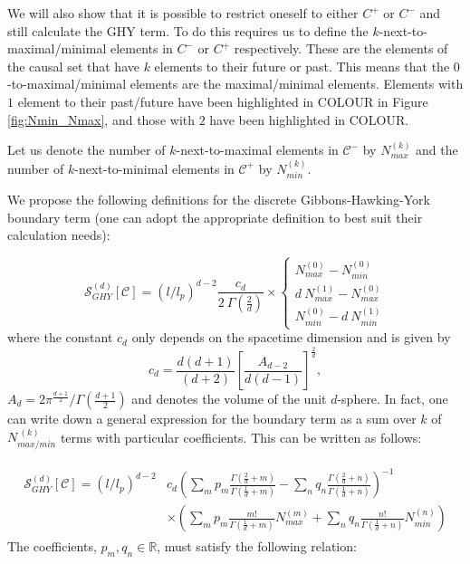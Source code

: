 \documentclass[12pt]{article}
\newcommand{\be}{\begin{equation}}
\newcommand{\ee}{\end{equation}}
\newcommand{\mb}[1]{\marginnote{\texttt{\small MB:\,#1}}}
\begin{document}
We will also show that it is possible to restrict oneself to either $C^+$ or $C^-$ and still calculate the GHY term. To do this requires us to define the $k$-next-to-maximal/minimal elements in $C^-$ or $C^+$ respectively. These are the elements of the causal set that have $k$ elements to their future or past. This means that the $0$-to-maximal/minimal elements are the maximal/minimal elements. Elements with $1$ element to their past/future have been highlighted in COLOUR in Figure \ref{fig:Nmin_Nmax}, and those with $2$ have been highlighted in COLOUR.

Let us denote the number of $k$-next-to-maximal elements in $\mathcal C^-$ by $N_{max}^{(k)}$ and the number of $k$-next-to-minimal elements in $\mathcal C^+$  by $N_{min}^{(k)}$.

We propose the following definitions for the discrete Gibbons-Hawking-York boundary term (one can adopt the appropriate definition to best suit their calculation needs):\mb{$S[\mathcal C, \Sigma]$?}

\be\label{GH_boundary_to_causet}
 \mathcal{S}^{(d)}_{GHY}[\mathcal C]=\left(l/l_p\right)^{d-2}\frac{c_{d}}{2\: \Gamma\left(\frac{2}{d} \right)}\times
  \begin{cases}
   N_{max}^{(0)}-N_{min}^{(0)} \\
   d\: N_{max}^{(1)}-N_{max}^{(0)} \\
   N_{min}^{(0)}-d\: N_{min}^{(1)}
  \end{cases}
\ee
where the constant $c_{d}$ only depends on the spacetime dimension and is given by
\be\label{Cn}
c_{d}=\frac{d(d+1)}{(d+2)}\left[\frac{A_{d-2}}{d(d-1)}\right]^{\frac{2}{d}},
\ee
$A_d=2\pi^\frac{d+1}2/\Gamma\left(\frac{d+1}{2}\right)$ and denotes the volume of the unit $d$-sphere. In fact, one can write down a general expression for the boundary term as a sum over $k$ of $N_{max/min}^{\: (k)}$ terms with particular coefficients. This can be written as follows:

\begin{gather}\label{general_boundary_sum}
\begin{aligned}
\mathcal{S}^{(d)}_{GHY}[\mathcal C]=\left(l/l_p\right)^{d-2} & c_{d}\left( \sum_m p_m \frac{\Gamma\left(\frac{2}{d}+m \right)}{\Gamma\left(\frac{1}{d}+m \right)}  - \sum_n q_n\frac{\Gamma\left(\frac{2}{d}+n \right)}{\Gamma\left(\frac{1}{d}+n \right)} \right)^{-1} \\
& \times \left( \sum_m p_m \frac{m!}{\Gamma\left(\frac{1}{d}+m \right)} N_{max}^{(m)}
+  \sum_n q_n \frac{n!}{\Gamma\left(\frac{1}{d}+n \right)} N_{min}^{(n)}\right)
\end{aligned}
\end{gather}
The coefficients, $p_m , q_n \in \mathbb{R}$, must satisfy the following relation:
\end{document}
